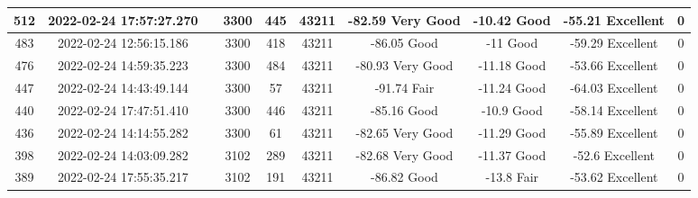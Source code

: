 \begin{longtable*}{|c|c|c|c|c|c|c|c|c|c|}
512&2022-02-24 17:57:27.270&&3300&445&43211& -82.59    Very Good   & -10.42    Good        & -55.21    Excellent   & 0\\\hline
{}483&2022-02-24 12:56:15.186&&3300&418&43211& -86.05    Good        & -11       Good        & -59.29    Excellent   & 0\\\hline
{}476&2022-02-24 14:59:35.223&&3300&484&43211& -80.93    Very Good   & -11.18    Good        & -53.66    Excellent   & 0\\\hline
{}447&2022-02-24 14:43:49.144&&3300&57&43211& -91.74    Fair        & -11.24    Good        & -64.03    Excellent   & 0\\\hline
{}440&2022-02-24 17:47:51.410&&3300&446&43211& -85.16    Good        & -10.9     Good        & -58.14    Excellent   & 0\\\hline
{}436&2022-02-24 14:14:55.282&&3300&61&43211& -82.65    Very Good   & -11.29    Good        & -55.89    Excellent   & 0\\\hline
{}398&2022-02-24 14:03:09.282&&3102&289&43211& -82.68    Very Good   & -11.37    Good        & -52.6     Excellent   & 0\\\hline
{}389&2022-02-24 17:55:35.217&&3102&191&43211& -86.82    Good        & -13.8     Fair        & -53.62    Excellent   & 0\\\hline

\end{longtable*}
